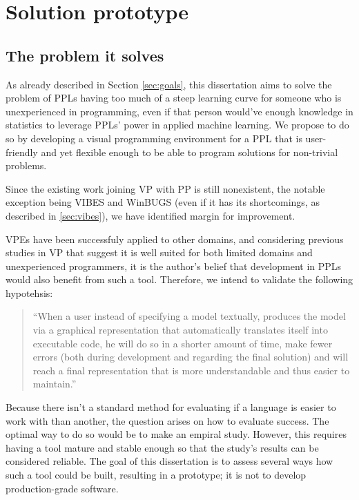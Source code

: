 \chapter{Solution prototype}\label{chap:chap3}


\section{The problem it solves}

As already described in Section \ref{sec:goals}, this dissertation aims to solve
the problem of PPLs having too much of a steep learning curve for someone who
is unexperienced in programming, even if that person would've enough knowledge
in statistics to leverage PPLs' power in applied machine learning. We propose
to do so by developing a visual programming environment for a PPL that is user-friendly
and yet flexible enough to be able to program solutions for non-trivial problems.

Since the existing work joining VP with PP is still nonexistent, the notable exception
being VIBES and WinBUGS (even if it has its shortcomings, as described in \ref{sec:vibes}),
we have identified margin for improvement.

VPEs have been successfuly
applied to other domains, and considering previous studies in VP that suggest it is
well suited for both limited domains and unexperienced programmers, it is the
author's belief that development in PPLs would also benefit from such a tool.
Therefore, we intend to validate the following hypotehsis:

\begin{quote}
  ``When a user instead of specifying a model textually,
  produces the model via a graphical representation that automatically translates
  itself into executable code, he will do so in a shorter amount of time, make
  fewer errors (both during development and regarding the final solution) and
  will reach a final representation that is more understandable and thus
  easier to maintain.''
\end{quote}

Because there isn't a standard method for evaluating if a language is easier
to work with than another, the question arises on how to evaluate success.
The optimal way to do so would be to make an empiral
study. However, this requires having a tool mature and stable enough so that the
study's results can be considered reliable. The goal of this dissertation is to
assess several ways how such a tool could be built, resulting in a prototype;
it is not to develop production-grade software.


